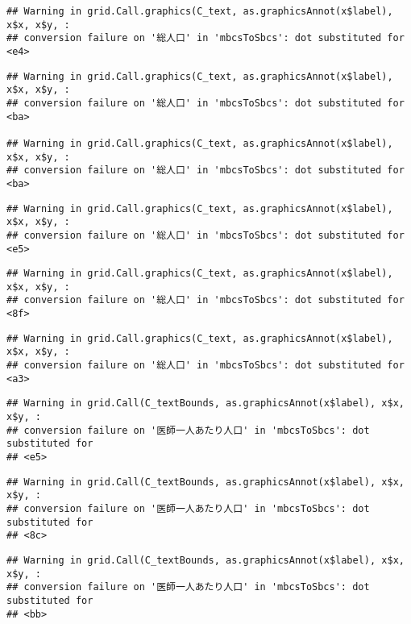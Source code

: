 \documentclass[
]{article}
\begin{document}
\begin{verbatim}
## Warning in grid.Call.graphics(C_text, as.graphicsAnnot(x$label), x$x, x$y, :
## conversion failure on '総人口' in 'mbcsToSbcs': dot substituted for <e4>
\end{verbatim}

\begin{verbatim}
## Warning in grid.Call.graphics(C_text, as.graphicsAnnot(x$label), x$x, x$y, :
## conversion failure on '総人口' in 'mbcsToSbcs': dot substituted for <ba>

## Warning in grid.Call.graphics(C_text, as.graphicsAnnot(x$label), x$x, x$y, :
## conversion failure on '総人口' in 'mbcsToSbcs': dot substituted for <ba>
\end{verbatim}

\begin{verbatim}
## Warning in grid.Call.graphics(C_text, as.graphicsAnnot(x$label), x$x, x$y, :
## conversion failure on '総人口' in 'mbcsToSbcs': dot substituted for <e5>
\end{verbatim}

\begin{verbatim}
## Warning in grid.Call.graphics(C_text, as.graphicsAnnot(x$label), x$x, x$y, :
## conversion failure on '総人口' in 'mbcsToSbcs': dot substituted for <8f>
\end{verbatim}

\begin{verbatim}
## Warning in grid.Call.graphics(C_text, as.graphicsAnnot(x$label), x$x, x$y, :
## conversion failure on '総人口' in 'mbcsToSbcs': dot substituted for <a3>
\end{verbatim}

\begin{verbatim}
## Warning in grid.Call(C_textBounds, as.graphicsAnnot(x$label), x$x, x$y, :
## conversion failure on '医師一人あたり人口' in 'mbcsToSbcs': dot substituted for
## <e5>
\end{verbatim}

\begin{verbatim}
## Warning in grid.Call(C_textBounds, as.graphicsAnnot(x$label), x$x, x$y, :
## conversion failure on '医師一人あたり人口' in 'mbcsToSbcs': dot substituted for
## <8c>
\end{verbatim}

\begin{verbatim}
## Warning in grid.Call(C_textBounds, as.graphicsAnnot(x$label), x$x, x$y, :
## conversion failure on '医師一人あたり人口' in 'mbcsToSbcs': dot substituted for
## <bb>
\end{verbatim}
\end{document}
